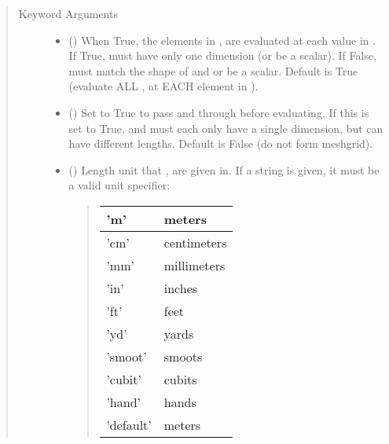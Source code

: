 \documentclass[letterpaper,10pt,english]{sphinxmanual}
\begin{document}
\begin{fulllineitems}
\begin{fulllineitems}
\begin{quote}
\begin{description}
\begin{itemize}
\end{itemize}

\item[{Keyword Arguments}] \leavevmode\begin{itemize}
\item {} 
 () \textendash{} When True, the elements in ,  are evaluated
at each value in . If True,  must have only one dimension
(or be a scalar). If False,  must match the shape of  and
 or be a scalar. Default is True (evaluate ALL ,  at
EACH element in ).

\item {} 
 () \textendash{} Set to True to pass  and  through
 before evaluating. If this is set to
True,  and  must each only have a single dimension, but
can have different lengths. Default is False (do not form
meshgrid).

\item {} 
 () \textendash{} 
Length unit that ,  are given in.
If a string is given, it must be a valid unit specifier:
\begin{quote}


\begin{savenotes}\sphinxattablestart
\centering
\begin{tabulary}{\linewidth}[t]{|T|T|}
\hline

’m’
&
meters
\\
\hline
’cm’
&
centimeters
\\
\hline
’mm’
&
millimeters
\\
\hline
’in’
&
inches
\\
\hline
’ft’
&
feet
\\
\hline
’yd’
&
yards
\\
\hline
’smoot’
&
smoots
\\
\hline
’cubit’
&
cubits
\\
\hline
’hand’
&
hands
\\
\hline
’default’
&
meters
\\
\hline
\end{tabulary}
\par
\sphinxattableend\end{savenotes}
\end{quote}


\end{itemize}
\end{description}
\end{quote}
\end{fulllineitems}
\end{fulllineitems}
\end{document}
